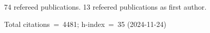 74 refereed publications. 13 refeered publications as first author.

Total citations~=~4481; h-index~=~35 (2024-11-24)